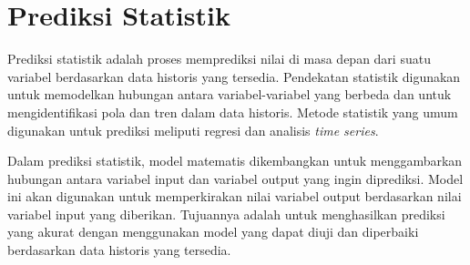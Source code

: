 \section{Prediksi Statistik}
Prediksi statistik adalah proses memprediksi nilai di masa depan dari suatu variabel berdasarkan data historis yang tersedia. Pendekatan statistik digunakan untuk memodelkan hubungan antara variabel-variabel yang berbeda dan untuk mengidentifikasi pola dan tren dalam data historis. Metode statistik yang umum digunakan untuk prediksi meliputi regresi dan analisis \textit{time series}.

Dalam prediksi statistik, model matematis dikembangkan untuk menggambarkan hubungan antara variabel input dan variabel output yang ingin diprediksi. Model ini akan digunakan untuk memperkirakan nilai variabel output berdasarkan nilai variabel input yang diberikan. Tujuannya adalah untuk menghasilkan prediksi yang akurat dengan menggunakan model yang dapat diuji dan diperbaiki berdasarkan data historis yang tersedia.

